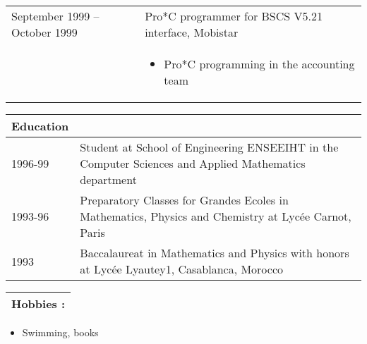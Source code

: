 \documentclass[a4paper,11pt]{article}
\begin{document}
\begin{longtable}{p{}p{}}
September 1999 -- October 1999 & Pro*C programmer for BSCS V5.21 interface, Mobistar \\
	
& \begin{itemize}
\item Pro*C programming in the accounting team
\end{itemize} \\

\end{longtable}

\begin{tabular}{p{}p{}}
\hline
\textbf{Education} & \\
\hline

1996-99     & Student at School of Engineering ENSEEIHT in the Computer Sciences and Applied Mathematics department \\
1993-96     &  Preparatory Classes for Grandes Ecoles in Mathematics, Physics and Chemistry at Lyc\'ee Carnot, Paris \\
1993     &  Baccalaureat in Mathematics and Physics with honors at Lyc\'ee Lyautey1, Casablanca, Morocco \\
\end{tabular}

\begin{tabular}{p{\textwidth}}
\hline
\textbf{Hobbies :}\\
\hline
\end{tabular}
\begin{itemize}
\item Swimming, books
\end{itemize}

\end{document}
